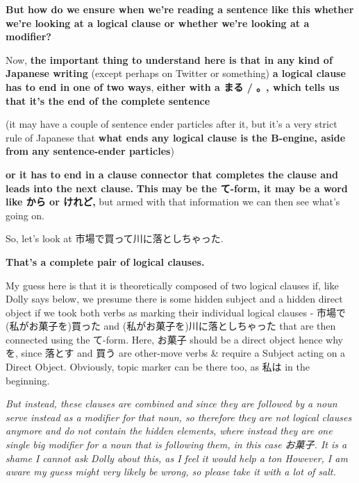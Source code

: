 {\bf But how do we ensure when we're reading a sentence like this whether we're looking at a logical clause or whether we're looking at a modifier?}

\stopsectionlevel

\startsectionlevel[title={How to know if it is a logical clause or a modifier?},reference={how-to-know-if-it-is-a-logical-clause-or-a-modifier}]

Now, {\bf the important thing to understand here is that in any kind of Japanese writing}\crlf
(except perhaps on Twitter or something)\crlf
{\bf a logical clause has to end in one of two ways}, {\bf either with a まる / 。, which tells us that it's the end of the complete sentence}

(it may have a couple of sentence ender particles after it, but it's a very strict rule of Japanese that {\bf what ends any logical clause is the B-engine, aside from any sentence-ender particles})

\thinrule

{\bf or it has to end in a clause connector that completes the clause and leads into the next clause.} {\bf This may be the て-form, it may be a word like から or けれど,} but armed with that information we can then see what's going on.

So, let's look at 市場で買って川に落としちゃった.

{\bf That's a complete pair of logical clauses.}

My guess here is that it is theoretically composed of two logical clauses if, like Dolly says below, we presume there is some hidden subject and a hidden direct object if we took both verbs as marking their individual logical clauses - 市場で(私がお菓子を)買った and (私がお菓子を)川に落としちゃった that are then connected using the て-form. Here, お菓子 should be a direct object hence why を, since 落とす and 買う are other-move verbs & require a Subject acting on a Direct Object. Obviously, topic marker can be there too, as 私は in the beginning.

{\em But instead, these clauses are combined and since they are followed by a noun serve instead as a modifier for that noun, so therefore they are not logical clauses anymore and do not contain the hidden elements, where instead they are one single big modifier for a noun that is following them, in this case お菓子. It is a shame I cannot ask Dolly about this, as I feel it would help a ton\crlf
However, I am aware my guess might very likely be wrong, so please take it with a lot of salt.}

